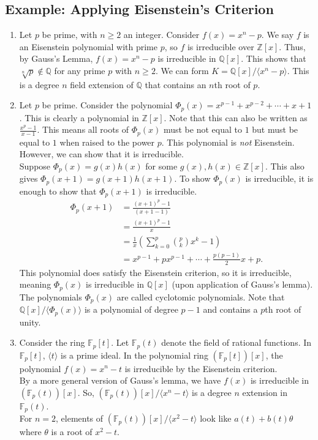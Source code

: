 \documentclass[8pt]{extarticle}
\newcommand{\Q}{\mathbb{Q}}
\newcommand{\Z}{\mathbb{Z}}
\begin{document}
  \subsection{Example: Applying Eisenstein's Criterion}%
  \begin{enumerate}[(1)]
    \item Let $p$ be prime, with $n\geq 2$ an integer. Consider $f(x) = x^n - p$. We say $f$ is an Eisenstein polynomial with prime $p$, so $f$ is irreducible over $\Z[x]$. Thus, by Gauss's Lemma, $f(x) = x^n - p$ is irreducible in $\Q[x]$. This shows that $\sqrt[n]{p}\notin \Q$ for any prime $p$ with $n\geq 2$. We can form $K = \Q[x]/\langle x^n - p\rangle$. This is a degree $n$ field extension of $\Q$ that contains an $n$th root of $p$.
    \item Let $p$ be prime. Consider the polynomial $\Phi_{p}(x) = x^{p-1} + x^{p-2} + \cdots + x + 1$. This is clearly a polynomial in $\Z[x]$. Note that this can also be written as $\frac{x^p-1}{x-1}.$ This means all roots of $\Phi_{p}(x)$ must be not equal to $1$ but must be equal to $1$ when raised to the power $p$. This polynomial is \textit{not} Eisenstein. However, we can show that it is irreducible.\\

      Suppose $\Phi_p(x) = g(x)h(x)$ for some $g(x),h(x)\in \Z[x]$. This also gives $\Phi_p(x+1) = g(x+1)h(x+1)$. To show $\Phi_p(x)$ is irreducible, it is enough to show that $\Phi_p(x+1)$ is irreducible.
      \begin{align*}
        \Phi_p(x+1) &= \frac{(x+1)^p-1}{(x+1-1)}\\
                    &= \frac{(x+1)^p - 1}{x}\\
                    &= \frac{1}{x}\left(\sum_{k=0}^{p}{p\choose k}x^k - 1\right)\\
                    &= x^{p-1} + px^{p-1} + \cdots + \frac{p(p-1)}{2}x + p.
      \end{align*}
      This polynomial does satisfy the Eisenstein criterion, so it is irreducible, meaning $\Phi_{p}(x)$ is irreducible in $\Q[x]$ (upon application of Gauss's lemma).\\

      The polynomials $\Phi_p(x)$ are called cyclotomic polynomials. Note that $\Q[x]/\langle \Phi_p(x)\rangle$ is a polynomial of degree $p-1$ and contains a $p$th root of unity.
    \item Consider the ring $\mathbb{F}_{p}[t]$. Let $\mathbb{F}_p(t)$ denote the field of rational functions. In $\mathbb{F}_p[t]$, $\langle t \rangle$ is a prime ideal. In the polynomial ring $(\mathbb{F}_p[t])[x]$, the polynomial $f(x) = x^n - t$ is irreducible by the Eisenstein criterion.\\

      By a more general version of Gauss's lemma, we have $f(x)$ is irreducible in $(\mathbb{F}_p(t))[x]$. So, $(\mathbb{F}_p(t))[x]/\langle x^n - t \rangle$ is a degree $n$ extension in $\mathbb{F}_p(t)$.\\

      For $n = 2$, elements of $(\mathbb{F}_p(t))[x] /\langle x^2 - t \rangle$ look like $a(t) + b(t)\theta$ where $\theta$ is a root of $x^2 - t$.
  \end{enumerate}
\end{document}
